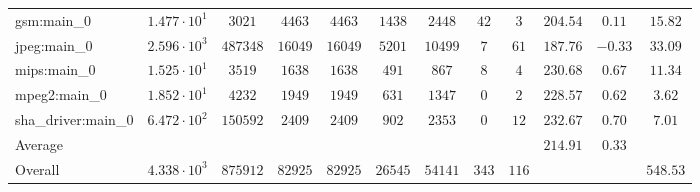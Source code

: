 \begin{tabular}{|l|c|c|c|c|c|c|c|c|c|c|c|}
gsm:main\_0             & $ 1.477 \cdot 10^{1}  $ & $ 3021   $ & $ 4463  $ & $ 4463  $ & $ 1438  $ & $ 2448  $ & $ 42  $ & $ 3   $ & $ 204.54      $ & $ 0.11    $ & $ 15.82   $ \\
jpeg:main\_0            & $ 2.596 \cdot 10^{3}  $ & $ 487348 $ & $ 16049 $ & $ 16049 $ & $ 5201  $ & $ 10499 $ & $ 7   $ & $ 61  $ & $ 187.76      $ & $ -0.33   $ & $ 33.09   $ \\
mips:main\_0            & $ 1.525 \cdot 10^{1}  $ & $ 3519   $ & $ 1638  $ & $ 1638  $ & $ 491   $ & $ 867   $ & $ 8   $ & $ 4   $ & $ 230.68      $ & $ 0.67    $ & $ 11.34   $ \\
mpeg2:main\_0           & $ 1.852 \cdot 10^{1}  $ & $ 4232   $ & $ 1949  $ & $ 1949  $ & $ 631   $ & $ 1347  $ & $ 0   $ & $ 2   $ & $ 228.57      $ & $ 0.62    $ & $ 3.62    $ \\
sha\_driver:main\_0     & $ 6.472 \cdot 10^{2}  $ & $ 150592 $ & $ 2409  $ & $ 2409  $ & $ 902   $ & $ 2353  $ & $ 0   $ & $ 12  $ & $ 232.67      $ & $ 0.70    $ & $ 7.01    $ \\
\hline
Average                 & $                     $ & $        $ & $       $ & $       $ & $       $ & $       $ & $     $ & $     $ & $ 214.91      $ & $ 0.33    $ & $         $ \\
\hline
Overall                 & $ 4.338 \cdot 10^{3}  $ & $ 875912 $ & $ 82925 $ & $ 82925 $ & $ 26545 $ & $ 54141 $ & $ 343 $ & $ 116 $ & $             $ & $         $ & $ 548.53  $ \\
\hline
\end{tabular}
